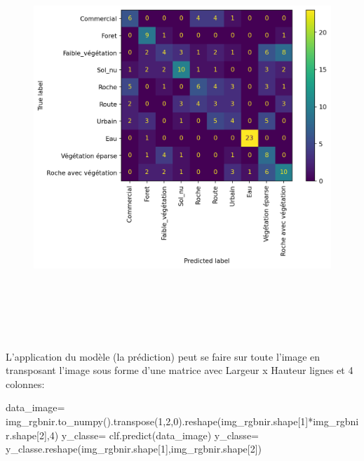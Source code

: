 \documentclass[
]{article}
\newenvironment{Shaded}{}{}
\newcommand{\DecValTok}[1]{\textcolor[rgb]{0.25,0.63,0.44}{#1}}
\newcommand{\NormalTok}[1]{#1}
\newcommand{\OperatorTok}[1]{\textcolor[rgb]{0.40,0.40,0.40}{#1}}
\begin{document}
\begin{figure}
\centering
\includegraphics[width=6.69792in,height=5.92708in]{05-ClassificationsSupervisees_files/figure-html/cell-30-output-1.png}
\caption{}
\end{figure}

L'application du modèle (la prédiction) peut se faire sur toute l'image
en transposant l'image sous forme d'une matrice avec Largeur x Hauteur
lignes et 4 colonnes:

\label{afcad211}
\label{cb34}
\begin{Shaded}
\begin{Highlighting}[]
\NormalTok{data\_image}\OperatorTok{=}\NormalTok{ img\_rgbnir.to\_numpy().transpose(}\DecValTok{1}\NormalTok{,}\DecValTok{2}\NormalTok{,}\DecValTok{0}\NormalTok{).reshape(img\_rgbnir.shape[}\DecValTok{1}\NormalTok{]}\OperatorTok{*}\NormalTok{img\_rgbnir.shape[}\DecValTok{2}\NormalTok{],}\DecValTok{4}\NormalTok{)}
\NormalTok{y\_classe}\OperatorTok{=}\NormalTok{ clf.predict(data\_image)}
\NormalTok{y\_classe}\OperatorTok{=}\NormalTok{ y\_classe.reshape(img\_rgbnir.shape[}\DecValTok{1}\NormalTok{],img\_rgbnir.shape[}\DecValTok{2}\NormalTok{])}
\end{Highlighting}
\end{Shaded}
\end{document}

